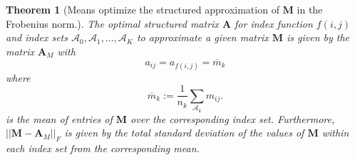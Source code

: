 \documentclass[letterpaper,12pt,oneside,final]{article}
\newtheorem{theorem}{Theorem}
\newcommand{\m}[1]{\mathbf{#1}}               %
\newcommand{\norm}[1]{||{#1}||}              %
\newcommand{\frob}[1]{\norm{#1}_F}
\newcommand{\widebar}[1]{\overline{#1}}
\begin{document}
\begin{theorem}[Means optimize the structured approximation of $\m{M}$ in the Frobenius norm.] \label{thm:genOptimal}
  The optimal structured matrix $\m{A}$ for index function $f(i,j)$ and index sets $\mathcal{A}_0, \mathcal{A}_1, \dots, \mathcal{A}_K$ to approximate a given matrix $\m{M}$ is given by the matrix $\m{A}_M$ with
  \begin{equation} \label{eq:meanStrucMat}
    a_{ij} = a_{f(i,j)} =  \widebar{m}_k
  \end{equation}
  where
  \begin{equation} \label{eq:strucMeans}
    \widebar{m}_k := \frac{1}{n_k} \sum_{\mathcal{A}_k} m_{ij}.
  \end{equation}
  is the mean of entries of $\m{M}$ over the corresponding index set. Furthermore, $\frob{\m{M} - \m{A}_M}$ is given by the total standard deviation of the values of $\m{M}$ within each index set from the corresponding mean.
\end{theorem}
\end{document}
